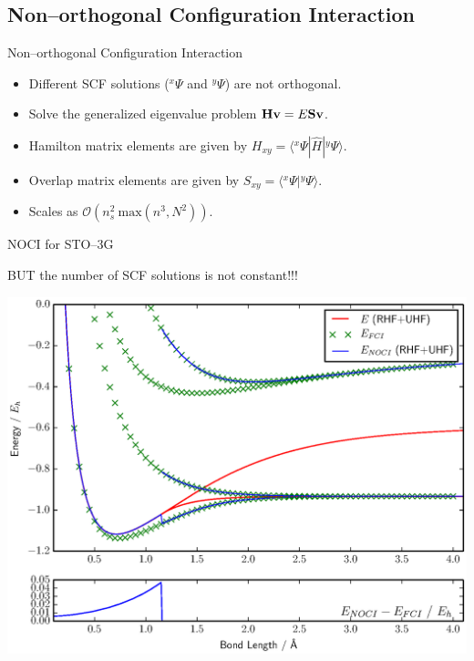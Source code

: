 \documentclass{beamer}
\newcommand{\braket}[3] {{\langle #1 | #2 | #3 \rangle}}
\newcommand{\brket}[2] {{\langle #1 | #2  \rangle}}
\newcommand{\up}[2] {{^{#1}\!#2}}
\begin{document}
\subsection{Non--orthogonal Configuration Interaction}
\begin{frame}{Non--orthogonal Configuration Interaction}
 \begin{itemize}
  \item<2-> Different SCF solutions ($\up{x}{\Psi}$ and $\up{y}{\Psi}$) are \alert{not orthogonal}.
  \item<3-> Solve the generalized eigenvalue problem ${\bf H v}=E{\bf S v}$.
  \item<4-> Hamilton matrix elements are given by $H_{xy}=\braket{\up{x}\Psi}{\hat H}{\up y\Psi}$.
  \item<5-> Overlap matrix elements are given by $S_{xy}=\brket{\up{x}\Psi}{\up y\Psi}$.
  \item<6-> Scales as $\mathcal{O}\left( n_s^2\ \mathrm{max}\left(n^3, N^2\right) \right).$
 \end{itemize}
\end{frame}

\begin{frame}{NOCI for  STO--3G}
  \begin{center} 
     BUT the number of SCF solutions is \alert{not constant}!!!
  \end{center}
  \begin{center}
     {
        \includegraphics[scale=0.38]{H2_normal}
        }
  \end{center}
\end{frame}
\end{document}
